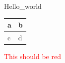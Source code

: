 \documentclass{article}
\begin{document}
Hello_world

\begin{tabular}{ll}
a & b \\
\toprule
c & d \\
\end{tabular}

\textcolor{red}{This should be red}
\end{document}

